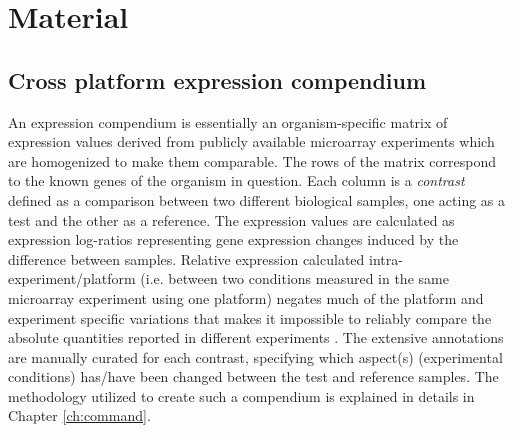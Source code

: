 \section{Material}


\subsection{Cross platform expression compendium}\label{sec:dist-comp} 

An expression compendium is essentially an organism-specific matrix of
expression values derived from publicly available microarray experiments which
are homogenized to make them comparable. The rows of the matrix correspond to
the known genes of the organism in question.
%
Each column is a \textit{contrast} defined as a comparison between two different
biological samples, one acting as a test and the other as a reference.
%
The expression values are calculated as expression log-ratios representing gene
expression changes induced by the difference between samples.
%
Relative expression calculated intra-experiment/platform (i.e. between two
conditions measured in the same microarray experiment using one platform)
negates much of the platform and experiment specific variations that makes it
impossible to reliably compare the absolute quantities reported in different
experiments \cite{Shi2006}.
%
The extensive annotations are manually curated for each contrast, specifying
which aspect(s) (experimental conditions) has/have been changed between the test
and reference samples.
%
The methodology utilized to create such a compendium is explained in details in
Chapter \ref{ch:command}.






